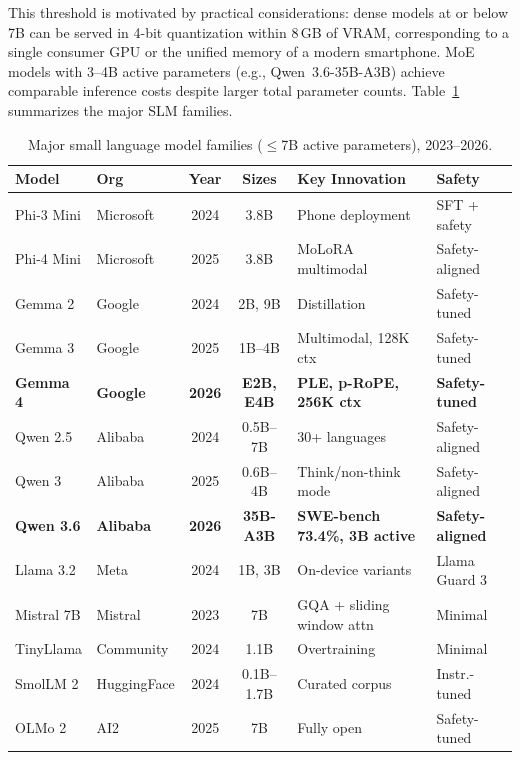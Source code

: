 \documentclass[12pt,a4paper]{article}
\begin{document}
This threshold is motivated by practical considerations: dense models at or below 7B can be served in 4-bit quantization within 8\,GB of VRAM, corresponding to a single consumer GPU or the unified memory of a modern smartphone. MoE models with 3--4B active parameters (e.g., Qwen~3.6-35B-A3B) achieve comparable inference costs despite larger total parameter counts. Table~\ref{tab:models} summarizes the major SLM families.

\begin{table}[t]
\centering
\caption{Major small language model families ($\leq$7B active parameters), 2023--2026.}\label{tab:models}
\scriptsize
\setlength{\tabcolsep}{3pt}
\begin{tabular}{@{}llccp{3.8cm}l@{}}
\toprule
\textbf{Model} & \textbf{Org} & \textbf{Year} & \textbf{Sizes} & \textbf{Key Innovation} & \textbf{Safety} \\
\midrule
Phi-3 Mini & Microsoft & 2024 & 3.8B & Phone deployment & SFT + safety \\
Phi-4 Mini & Microsoft & 2025 & 3.8B & MoLoRA multimodal & Safety-aligned \\
Gemma 2 & Google & 2024 & 2B, 9B & Distillation & Safety-tuned \\
Gemma 3 & Google & 2025 & 1B--4B & Multimodal, 128K ctx & Safety-tuned \\
\textbf{Gemma 4} & \textbf{Google} & \textbf{2026} & \textbf{E2B, E4B} & \textbf{PLE, p-RoPE, 256K ctx} & \textbf{Safety-tuned} \\
Qwen 2.5 & Alibaba & 2024 & 0.5B--7B & 30+ languages & Safety-aligned \\
Qwen 3 & Alibaba & 2025 & 0.6B--4B & Think/non-think mode & Safety-aligned \\
\textbf{Qwen 3.6} & \textbf{Alibaba} & \textbf{2026} & \textbf{35B-A3B} & \textbf{SWE-bench 73.4\%, 3B active} & \textbf{Safety-aligned} \\
Llama 3.2 & Meta & 2024 & 1B, 3B & On-device variants & Llama Guard 3 \\
Mistral 7B & Mistral & 2023 & 7B & GQA + sliding window attn & Minimal \\
TinyLlama & Community & 2024 & 1.1B & Overtraining & Minimal \\
SmolLM 2 & HuggingFace & 2024 & 0.1B--1.7B & Curated corpus & Instr.-tuned \\
OLMo 2 & AI2 & 2025 & 7B & Fully open & Safety-tuned \\
\bottomrule
\end{tabular}
\end{table}
\end{document}
